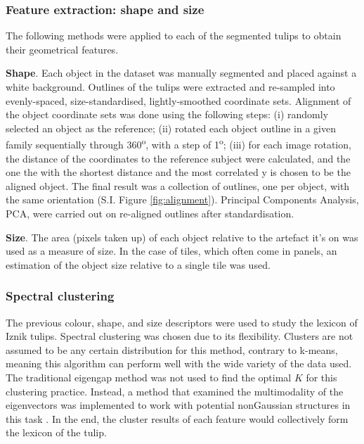\documentclass[11pt]{article}
\begin{document}
\subsubsection{Feature extraction: shape and size}
The following methods were applied to each of the segmented tulips to obtain their geometrical features.\par
\textbf{Shape}.
Each object in the dataset was manually segmented and placed against a white background. Outlines of the tulips were extracted and re-sampled into evenly-spaced, size-standardised, lightly-smoothed coordinate sets. Alignment of the object coordinate sets was done using the following steps: (i) randomly selected an object as the reference; (ii) rotated each object outline in a given family sequentially through 360\textsuperscript{o}, with a step of 1\textsuperscript{o}; (iii) for each image rotation, the distance of the coordinates to the reference subject were calculated, and the one the with the shortest distance and the most correlated y is chosen to be the aligned object. The final result was a collection of outlines, one per object, with the same orientation (S.I. Figure \ref{fig:alignment}). Principal Components Analysis, PCA, were carried out on re-aligned outlines after standardisation. \par
\textbf{Size}.
The area (pixels taken up) of each object relative to the artefact it's on was used as a measure of size. In the case of tiles, which often come in panels, an estimation of the object size relative to a single tile was used. \par

\subsubsection{Spectral clustering}
The previous colour, shape, and size descriptors were used to study the lexicon of Iznik tulips. Spectral clustering was chosen due to its flexibility. Clusters are not assumed to be any certain distribution for this method, contrary to k-means, meaning this algorithm can perform well with the wide variety of the data used. The traditional eigengap method was not used to find the optimal $K$ for this clustering practice. Instead, a method that examined the multimodality of the eigenvectors was implemented to work with potential nonGaussian structures in this task \parencite{john2020spectrum}. In the end, the cluster results of each feature would collectively form the lexicon of the tulip. \par
\end{document}
